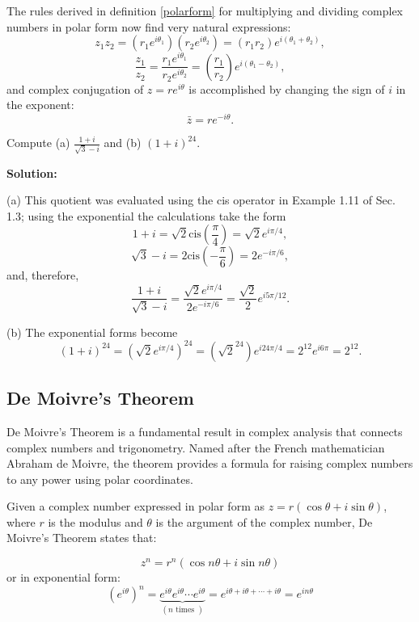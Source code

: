 \documentclass[
	12pt, %
	fleqn, %
	a4paper, %
]{LegrandOrangeBook}
\begin{document}
The rules derived in definition \ref{polarform} for multiplying and dividing complex numbers in polar form now find very natural expressions:
\begin{equation}
    z_1z_2 = (r_1e^{i\theta_1})(r_2e^{i\theta_2}) = (r_1r_2)e^{i(\theta_1+\theta_2)},
\end{equation}
\begin{equation}
    \frac{z_1}{z_2} = \frac{r_1e^{i\theta_1}}{r_2e^{i\theta_2}} = \left(\frac{r_1}{r_2}\right)e^{i(\theta_1-\theta_2)},
\end{equation}
and complex conjugation of \( z = re^{i\theta} \) is accomplished by changing the sign of \( i \) in the exponent:
\begin{equation}
    \bar{z} = re^{-i\theta}.
\end{equation}

\begin{example}
    Compute (a) \( \frac{1 + i}{\sqrt{3} - i} \) and (b) \( (1 + i)^{24} \).
\end{example}
\textbf{Solution:}


(a) This quotient was evaluated using the cis operator in Example 1.11 of Sec. 1.3; using the exponential the calculations take the form
\[
1 + i = \sqrt{2} \text{cis} \left(\frac{\pi}{4}\right) = \sqrt{2}e^{i\pi/4},
\]
\[
\sqrt{3} - i = 2 \text{cis} \left(-\frac{\pi}{6}\right) = 2e^{-i\pi/6},
\]
and, therefore,
\[
\frac{1 + i}{\sqrt{3} - i} = \frac{\sqrt{2}e^{i\pi/4}}{2e^{-i\pi/6}} = \frac{\sqrt{2}}{2} e^{i5\pi/12}.
\]

(b) The exponential forms become
\[
(1 + i)^{24} = \left(\sqrt{2}e^{i\pi/4}\right)^{24} = \left(\sqrt{2}^{24}\right)e^{i24\pi/4} = 2^{12} e^{i6\pi} = 2^{12}.
\]
\subsection{De Moivre's Theorem}
De Moivre's Theorem is a fundamental result in complex analysis that connects complex numbers and trigonometry. Named after the French mathematician Abraham de Moivre, the theorem provides a formula for raising complex numbers to any power using polar coordinates.

Given a complex number expressed in polar form as \( z = r(\cos \theta + i\sin \theta) \), where \( r \) is the modulus and \( \theta \) is the argument of the complex number, De Moivre's Theorem states that:
\begin{theorem}
    \begin{equation}
        z^n = r^n (\cos n\theta + i\sin n\theta)
    \end{equation}
    or in exponential form:
    \begin{equation}
        \left(e^{i \theta}\right)^{n}=\underbrace{e^{i \theta} e^{i \theta} \cdots e^{i \theta}}_{(n \text { times })}=e^{i \theta+i \theta+\cdots+i \theta}=e^{i n \theta}
    \end{equation}
\end{theorem}
\end{document}
